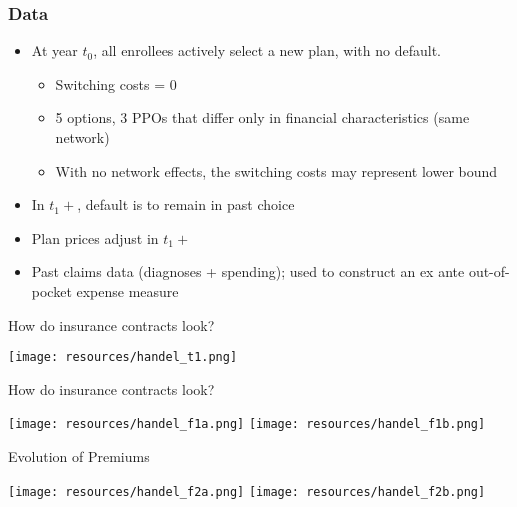 \begin{frame}
\frametitle{Data}

\begin{itemize}
\item At year $t_{0}$, all enrollees actively select a new plan, with no
default.

\begin{itemize}
\item Switching costs = 0

\item 5 options, 3 PPOs that differ only in financial characteristics (same
network)

\item With no network effects, the switching costs may represent lower bound
\end{itemize}

\item In $t_{1}+$, default is to remain in past choice

\item Plan prices adjust in $t_{1}+$

\item Past claims data (diagnoses + spending); used to construct an ex ante out-of-pocket expense
measure

\end{itemize}
\end{frame}

\begin{frame}{How do insurance contracts look?}
\begin{center}
\texttt{[image: resources/handel\_t1.png]}
\end{center}
\end{frame}


\begin{frame}{How do insurance contracts look?}
\begin{center}
\texttt{[image: resources/handel\_f1a.png]}
\texttt{[image: resources/handel\_f1b.png]}
\end{center}
\end{frame}

\begin{frame}{Evolution of Premiums}
\begin{center}
\texttt{[image: resources/handel\_f2a.png]}
\texttt{[image: resources/handel\_f2b.png]}
\end{center}
\end{frame}



